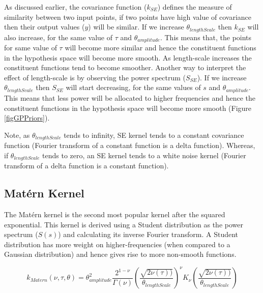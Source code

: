 As discussed earlier, the covariance function ($k_{SE}$) defines the measure of similarity between two input points, if two points have high value of covariance then their output values ($y$) will be similar. If we increase $\theta_{lengthScale}$ then $k_{SE}$ will also increase, for the same value of $\tau$ and $\theta_{amplitude}$. This means that, the points for same value of $\tau$ will become more similar and hence the constituent functions in the hypothesis space will become more smooth. As length-scale increases the constituent functions tend to become smoother. Another way to interpret the effect of length-scale is by observing the power spectrum ($S_{SE}$). If we increase $\theta_{lengthScale}$ then $S_{SE}$ will start decreasing, for the same values of $s$ and $\theta_{amplitude}$. This means that less power will be allocated to higher frequencies and hence the constituent functions in the hypothesis space will become more smooth (Figure \ref{figGPPriors}). 


Note, as $\theta_{lengthScale}$ tends to infinity, SE kernel tends to a constant covariance function (Fourier transform of a constant function is a delta function). Whereas, if $\theta_{lengthScale}$ tends to zero, an SE kernel tends to a white noise kernel (Fourier transform of a delta function is a constant function).

\subsection{Mat\'ern Kernel}\label{subsecCh4MaternKernel}
The Mat\'ern kernel is the second most popular kernel after the squared exponential. This kernel is derived using a Student distribution as the power spectrum ($S(s)$) and calculating its inverse Fourier transform. A Student distribution has more weight on higher-frequencies (when compared to a Gaussian distribution) and hence gives rise to more non-smooth functions. 

\begin{equation}
k_{Matern}(\nu, \tau, \theta) = \theta_{amplitude}^2\frac{2^{1- \nu }}{\Gamma (\nu)}\left ( \frac{\sqrt{2\nu(\tau))}}{\theta_{lengthScale}} \right )^{\nu}K_{\nu}\left ( \frac{\sqrt{2\nu(\tau))}}{\theta_{lengthScale}} \right)
\end{equation}

